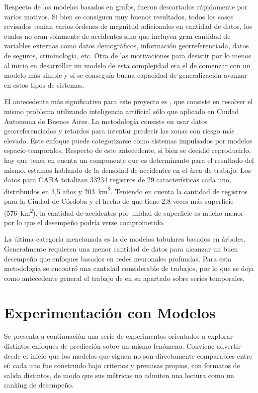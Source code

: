 Respecto de los modelos basados en grafos, fueron descartados rápidamente por varios motivos. Si bien se consiguen muy buenos resultados, todos los casos revisados tenían varios órdenes de magnitud adicionales en cantidad de datos, los cuales no eran solamente de accidentes sino que incluyen gran cantidad de variables externas como datos demográficos, información georreferenciada, datos de seguros, criminología, etc. Otra de las motivaciones para desistir por lo menos al inicio en desarrollar un modelo de esta complejidad era el de comenzar con un modelo más simple y si se conseguía buena capacidad de generalización avanzar en estos tipos de sistemas.

El antecedente más significativo para este proyecto es \textcite{novello2022}, que consiste en resolver el mismo problema utilizando inteligencia artificial sólo que aplicado en Ciudad Autonoma de Buenos Aires. La metodología consiste en usar datos georreferenciados y retardos para intentar predecir las zonas con riesgo más elevado. Este enfoque puede categorizarse como sistemas impulsados por modelos espacio-temporales. Respecto de este antecedente, si bien se decidió reproducirlo, hay que tener en cuenta un componente que es determinante para el resultado del mismo, estamos hablando de la densidad de accidentes en el área de trabajo. Los datos para CABA totalizan \num{33234} registros de 29 características cada uno, distribuidos en 3,5 años y \qty{203}{\kilo\metre\squared}. Teniendo en cuenta la cantidad de registros para la Ciudad de Córdoba y el hecho de que tiene 2,8 veces más superficie (\qty{576}{\kilo\metre\squared}), la cantidad de accidentes por unidad de superficie es mucho menor por lo que el desempeño podría verse comprometido.

La última categoría mencionada es la de modelos tabulares basados en árboles. Generalmente requieren una menor cantidad de datos para alcanzar un buen desempeño que enfoques basados en redes neuronales profundas. Para esta metodología se encontró una cantidad considerable de trabajos, por lo que se deja como antecedente general el trabajo de \textcite{zheng2018} en su apartado sobre series temporales.

\section{Experimentación con Modelos}\label{experimentaciuxf3n-con-modelos}

Se presenta a continuación una serie de experimentos orientados a explorar distintos enfoques de predicción sobre un mismo fenómeno. Conviene advertir desde el inicio que los modelos que siguen no son directamente comparables entre sí: cada uno fue construido bajo criterios y premisas propios, con formatos de salida distintos, de modo que sus métricas no admiten una lectura como un ranking de desempeño.


